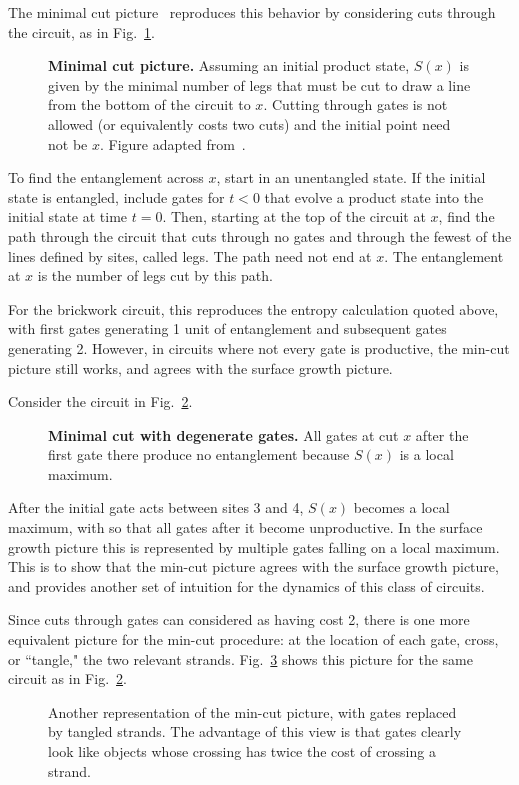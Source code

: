 The minimal cut picture~\cite{Nahum2017} reproduces this behavior by considering cuts through the circuit, as in Fig.~\ref{fig:mincut}.
\begin{figure}
	\centering
	
	\caption{\textbf{Minimal cut picture.} Assuming an initial product state, $S(x)$ is given by the minimal number of legs that must be cut to draw a line from the bottom of the circuit to $x$. Cutting through gates is not allowed (or equivalently costs two cuts) and the initial point need not be $x$. Figure adapted from~\cite{Nahum2017}.}
	\label{fig:mincut}
\end{figure}
To find the entanglement across $x$, start in an unentangled state. If the initial state is entangled, include gates for $t<0$ that evolve a product state into the initial state at time $t=0$. Then, starting at the top of the circuit at $x$, find the path through the circuit that cuts through no gates and through the fewest of the lines defined by sites, called legs. The path need not end at $x$. The entanglement at $x$ is the number of legs cut by this path. 

For the brickwork circuit, this reproduces the entropy calculation quoted above, with first gates generating 1 unit of entanglement and subsequent gates generating 2. However, in circuits where not every gate is productive, the min-cut picture still works, and agrees with the surface growth picture.

Consider the circuit in Fig.~\ref{fig:degeneratemincut}.
\begin{figure}
	\centering
	
	\caption{\textbf{Minimal cut with degenerate gates.} All gates at cut $x$ after the first gate there produce no entanglement because $S(x)$ is a local maximum.}
	\label{fig:degeneratemincut}
\end{figure}
After the initial gate acts between sites 3 and 4, $S(x)$ becomes a local maximum, with so that all gates after it become unproductive. In the surface growth picture this is represented by multiple gates falling on a local maximum. This is to show that the min-cut picture agrees with the surface growth picture, and provides another set of intuition for the dynamics of this class of circuits.

Since cuts through gates can considered as having cost 2, there is one more equivalent picture for the min-cut procedure: at the location of each gate, cross, or ``tangle," the two relevant strands. Fig.~\ref{fig:anothermincut} shows this picture for the same circuit as in Fig.~\ref{fig:degeneratemincut}.
\begin{figure}
	\centering
	
	\caption{Another representation of the min-cut picture, with gates replaced by tangled strands. The advantage of this view is that gates clearly look like objects whose crossing has twice the cost of crossing a strand.}
	\label{fig:anothermincut}
\end{figure}

